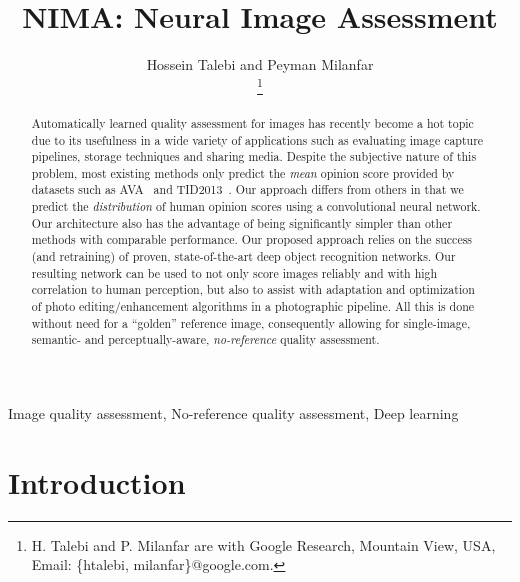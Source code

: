 \documentclass[10pt,twocolumn,twoside]{IEEEtran}
\begin{document}
\title{NIMA: Neural Image Assessment}
\author{Hossein Talebi and Peyman Milanfar\\
\thanks{H. Talebi and P. Milanfar are with Google Research, Mountain View, USA, Email: \{htalebi, milanfar\}@google.com.}
}

\maketitle
\vspace{-0cm}


\begin{abstract}
\vspace{-0 mm}
Automatically learned quality assessment for images has recently become a hot topic due to its usefulness in a wide variety of applications such as evaluating image capture pipelines, storage techniques and sharing media. Despite the subjective nature of this problem, most existing methods only predict the \textit{mean} opinion score provided by datasets such as AVA~\cite{murray2012ava} and TID2013~\cite{ponomarenko2013color}. Our approach differs from others in that we predict the \textit{distribution} of human opinion scores using a convolutional neural network. Our architecture also has the advantage of being significantly simpler than other methods with comparable performance. Our proposed approach relies on the success (and retraining) of proven, state-of-the-art deep object recognition networks. Our resulting network can be used to not only score images reliably and with high correlation to human perception, but also to assist with adaptation and optimization of photo editing/enhancement algorithms in a photographic pipeline. All this is done without need for a ``golden'' reference image, consequently allowing for single-image, semantic- and perceptually-aware, \textit{no-reference} quality assessment. 
\end{abstract}

\begin{IEEEkeywords}
Image quality assessment, No-reference quality assessment, Deep learning
\end{IEEEkeywords}

\section{Introduction}
\label{sec:Introduction}
\vspace{0 mm}
\end{document}
